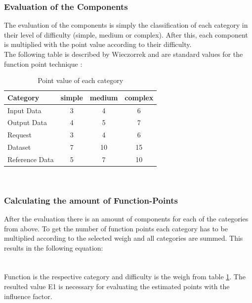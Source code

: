 \subsubsection{Evaluation of the Components}

The evaluation of the components is simply the classification of each category in their level of difficulty (simple, medium or complex). After this, each component is multiplied with the point value according to their difficulty. \\
The following table is described by Wieczorrek and are standard values for the function point technique \cite{fpafundamentals}:\\
\begin{table}[h] 
	\centering 
	\setlength{\tabcolsep}{4pt}
	\begin{tabular}{|l||c|c|c|}\hline
		Category & simple & medium & complex \\ \hline\hline
		Input Data & 3 & 4 & 6\\ \hline
		Output Data & 4 & 5 & 7\\ \hline
		Request & 3 & 4 & 6\\ \hline
		Dataset & 7 & 10 & 15\\ \hline
		Reference Data & 5 & 7 & 10\\ \hline
	\end{tabular}
	\caption{Point value of each category} 
	\label{tab:pointvalues} 
\end{table} \\

\subsubsection{ Calculating the amount of Function-Points}

After the evaluation there is an amount of components for each of the categories from above. To get the number of function points each category has to be multiplied according to the selected weigh and all categories are summed. This results in the following equation:\\

\\
\\
Function is the respective category and difficulty is the weigh from table \ref{tab:pointvalues}. The resulted value E1 is necessary for evaluating the estimated points with the influence factor.

